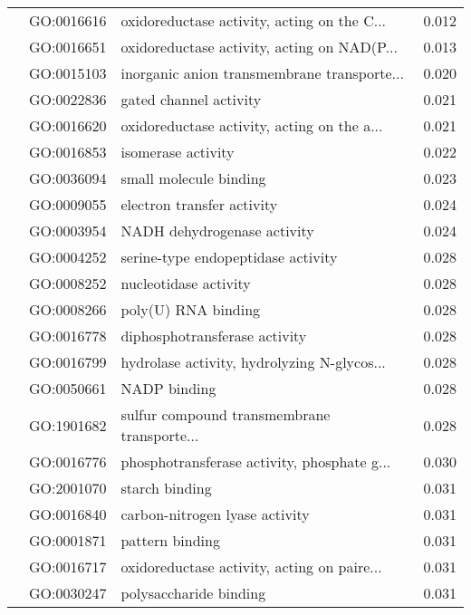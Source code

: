 \begin{longtable}{lllr}
   & GO:0016616 &  oxidoreductase activity, acting on the C... &         0.012 \\
   & GO:0016651 &  oxidoreductase activity, acting on NAD(P... &         0.013 \\
   & GO:0015103 &  inorganic anion transmembrane transporte... &         0.020 \\
   & GO:0022836 &                       gated channel activity &         0.021 \\
   & GO:0016620 &  oxidoreductase activity, acting on the a... &         0.021 \\
   & GO:0016853 &                           isomerase activity &         0.022 \\
   & GO:0036094 &                       small molecule binding &         0.023 \\
   & GO:0009055 &                   electron transfer activity &         0.024 \\
   & GO:0003954 &                  NADH dehydrogenase activity &         0.024 \\
   & GO:0004252 &           serine-type endopeptidase activity &         0.028 \\
   & GO:0008252 &                        nucleotidase activity &         0.028 \\
   & GO:0008266 &                          poly(U) RNA binding &         0.028 \\
   & GO:0016778 &                diphosphotransferase activity &         0.028 \\
   & GO:0016799 &  hydrolase activity, hydrolyzing N-glycos... &         0.028 \\
   & GO:0050661 &                                 NADP binding &         0.028 \\
   & GO:1901682 &  sulfur compound transmembrane transporte... &         0.028 \\
   & GO:0016776 &  phosphotransferase activity, phosphate g... &         0.030 \\
   & GO:2001070 &                               starch binding &         0.031 \\
   & GO:0016840 &               carbon-nitrogen lyase activity &         0.031 \\
   & GO:0001871 &                              pattern binding &         0.031 \\
   & GO:0016717 &  oxidoreductase activity, acting on paire... &         0.031 \\
   & GO:0030247 &                       polysaccharide binding &         0.031 \\

\end{longtable}
